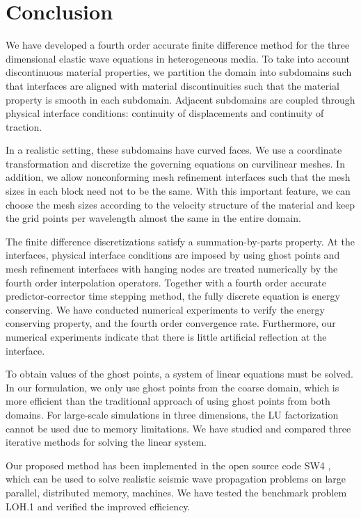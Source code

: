 \section{Conclusion}
We have developed a fourth order accurate finite difference method for the three dimensional elastic wave equations in heterogeneous media. To take into account discontinuous material properties, we partition the domain into subdomains such that interfaces are aligned with material discontinuities such that the material property is smooth in each subdomain. Adjacent subdomains are coupled through physical interface conditions: continuity of displacements and continuity of traction.

In a realistic setting, these subdomains have curved faces. We use a coordinate transformation and discretize the governing equations on curvilinear meshes. In addition, we allow nonconforming mesh refinement interfaces such that the mesh sizes in each block need not to be the same. With this important feature, we can choose the mesh sizes according to the velocity structure of the material and keep the grid points per wavelength almost the same in the entire domain. 

The finite difference discretizations satisfy a summation-by-parts property. At the interfaces, physical interface conditions are imposed by using ghost points and mesh refinement interfaces with hanging nodes are treated numerically by the fourth order interpolation operators. Together with a fourth order accurate predictor-corrector time stepping method, the fully discrete equation is energy conserving. We have conducted numerical experiments to verify the energy conserving property, and the fourth order convergence rate. Furthermore, our numerical experiments indicate that there is little artificial reflection at the interface.

To obtain values of the ghost points, a system of linear equations must be solved. In our formulation, we only use ghost points from the coarse domain, which is more efficient than the traditional approach of using ghost points from both domains.  For large-scale simulations in three dimensions, the LU factorization cannot be used due to memory limitations. We have studied and compared three iterative methods for solving the linear system.

Our proposed method has been implemented in the open source code SW4 \cite{SW4}, which can be used to solve realistic seismic wave propagation problems on large parallel, distributed memory, machines. We have tested the benchmark problem LOH.1 and verified the improved efficiency. 